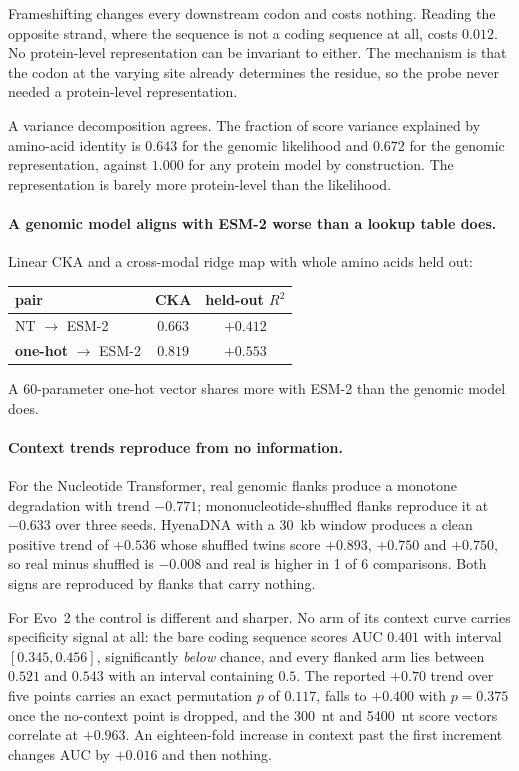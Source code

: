 \documentclass[11pt]{article}
\begin{document}
Frameshifting changes every downstream codon and costs nothing. Reading the
opposite strand, where the sequence is not a coding sequence at all, costs $0.012$.
No protein-level representation can be invariant to either. The mechanism is that
the codon at the varying site already determines the residue, so the probe never
needed a protein-level representation.

A variance decomposition agrees. The fraction of score variance explained by
amino-acid identity is $0.643$ for the genomic likelihood and $0.672$ for the
genomic representation, against $1.000$ for any protein model by construction. The
representation is barely more protein-level than the likelihood.

\paragraph{A genomic model aligns with ESM-2 worse than a lookup table does.}
Linear CKA and a cross-modal ridge map with whole amino acids held out:

\begin{table}[h]
\centering\small
\begin{tabular}{lcc}
\toprule
pair & CKA & held-out $R^2$ \\
\midrule
NT $\rightarrow$ ESM-2 & $0.663$ & $+0.412$ \\
\textbf{one-hot} $\rightarrow$ ESM-2 & $\mathbf{0.819}$ & $\mathbf{+0.553}$ \\
\bottomrule
\end{tabular}
\end{table}

A 60-parameter one-hot vector shares more with ESM-2 than the genomic model does.

\paragraph{Context trends reproduce from no information.} For the Nucleotide
Transformer, real genomic flanks produce a monotone degradation with trend
$-0.771$; mononucleotide-shuffled flanks reproduce it at $-0.633$ over three seeds.
HyenaDNA with a 30~kb window produces a clean positive trend of $+0.536$ whose
shuffled twins score $+0.893$, $+0.750$ and $+0.750$, so real minus shuffled is
$-0.008$ and real is higher in 1 of 6 comparisons. Both signs are reproduced by
flanks that carry nothing.

For Evo~2 the control is different and sharper. No arm of its context curve carries
specificity signal at all: the bare coding sequence scores AUC $0.401$ with
interval $[0.345,0.456]$, significantly \emph{below} chance, and every flanked arm
lies between $0.521$ and $0.543$ with an interval containing $0.5$. The reported
$+0.70$ trend over five points carries an exact permutation $p$ of $0.117$, falls
to $+0.400$ with $p=0.375$ once the no-context point is dropped, and the 300~nt and
5400~nt score vectors correlate at $+0.963$. An eighteen-fold increase in context
past the first increment changes AUC by $+0.016$ and then nothing.
\end{document}
